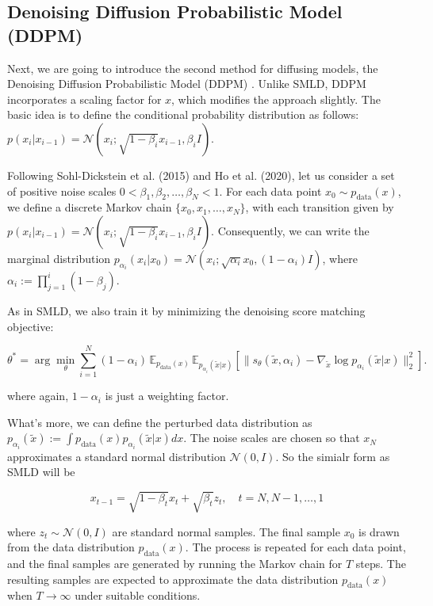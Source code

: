 \subsection{ Denoising Diffusion Probabilistic Model (DDPM)}
Next, we are going to introduce the second method for diffusing models, the Denoising Diffusion Probabilistic Model (DDPM) \cite{DDPM_2020}. Unlike SMLD, DDPM incorporates a scaling factor for \( x \), which modifies the approach slightly. The basic idea is to define the conditional probability distribution as follows: \( p(x_i | x_{i-1}) = \mathcal{N} \left( x_i ; \sqrt{1 - \beta_i} x_{i-1}, \beta_i I \right) \).

Following Sohl-Dickstein et al. (2015) and Ho et al. (2020), let us consider a set of positive noise scales \( 0 < \beta_1, \beta_2, \dots, \beta_N < 1 \). For each data point \( x_0 \sim p_{\text{data}}(x) \), we define a discrete Markov chain \( \{x_0, x_1, \dots, x_N\} \), with each transition given by \( p(x_i | x_{i-1}) = \mathcal{N} \left( x_i ; \sqrt{1 - \beta_i} x_{i-1}, \beta_i I \right) \). Consequently, we can write the marginal distribution \( p_{\alpha_i}(x_i | x_0) = \mathcal{N} \left( x_i ; \sqrt{\alpha_i} x_0, (1 - \alpha_i) I \right) \), where \( \alpha_i := \prod_{j=1}^i (1 - \beta_j) \).

As in SMLD, we also train it by minimizing the denoising score matching objective:

\begin{equation}
\theta^* = \arg \min_{\theta} \sum_{i=1}^{N} (1-\alpha_i) \, \mathbb{E}_{p_{\text{data}}(x)} \, \mathbb{E}_{p_{\alpha_i}(\tilde{x} | x)} \left[ \| s_\theta(\tilde{x}, \alpha_i) - \nabla_{\tilde{x}} \log p_{\alpha_i}(\tilde{x} | x) \|_2^2 \right].
\end{equation}

where again, $1-\alpha_i$ is just a weighting factor.

What's more, we can define the perturbed data distribution as \( p_{\alpha_i}(\tilde{x}) := \int p_{\text{data}}(x) p_{\alpha_i}(\tilde{x} | x) dx \). The noise scales are chosen so that \( x_N \) approximates a standard normal distribution \( \mathcal{N}(0, I) \). So the simialr form as SMLD will be 

\begin{equation}
    x_{t-1} = \sqrt{1 - \beta_t} x_t + \sqrt{\beta_t} z_t, \quad t = N, N-1, \dots, 1  
\end{equation}

where \( z_t \sim \mathcal{N}(0, I) \) are standard normal samples. The final sample \( x_0 \) is drawn from the data distribution \( p_{\text{data}}(x) \). The process is repeated for each data point, and the final samples are generated by running the Markov chain for \( T \) steps. The resulting samples are expected to approximate the data distribution \( p_{\text{data}}(x) \) when \( T \to \infty \) under suitable conditions.
